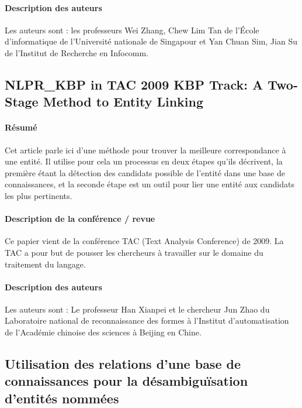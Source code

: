 \documentclass{article}
\begin{document}
\paragraph{Description des auteurs}

Les auteurs sont : les professeurs Wei Zhang, Chew Lim Tan de l'École d'informatique de l'Université nationale de Singapour et Yan Chuan Sim, Jian Su de l'Institut de Recherche en Infocomm.

\subsection{NLPR\_KBP in TAC 2009 KBP Track: A Two-Stage Method to Entity Linking\cite{article-10}}

\paragraph{Résumé}

Cet article parle ici d’une méthode pour trouver la meilleure correspondance à une entité. Il utilise pour cela un processus en deux étapes qu’ils décrivent, la première étant la détection des candidats possible de l’entité dans une base de connaissances, et la seconde étape est un outil pour lier une entité aux candidats les plus pertinents.


\paragraph{Description de la conférence / revue}

Ce papier vient de la conférence TAC (Text Analysis Conference) de 2009. La TAC a pour but de pousser les chercheurs à travailler sur le domaine du traitement du langage.


\paragraph{Description des auteurs}

Les auteurs sont : Le professeur Han Xianpei et le chercheur Jun Zhao du Laboratoire national de reconnaissance des formes à l'Institut d'automatisation de l'Académie chinoise des sciences à Beijing en Chine.


\subsection{Utilisation des relations d’une base de connaissances pour la désambiguïsation d’entités nommées\cite{article-11}}
\end{document}
